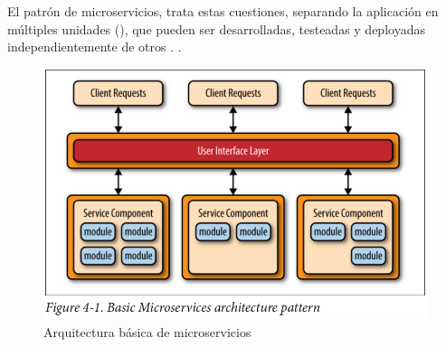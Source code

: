 El patrón de microservicios, trata estas cuestiones, separando la aplicación en múltiples unidades  (), que pueden ser desarrolladas, testeadas y deployadas independientemente de otros . .\cite[p.~27]{richards2015}

\begin{figure}
  \includegraphics[width=\linewidth]{src/images/02-capitulo-2/basic_microservices_arquitecture_pattern.png}
  \caption{Arquitectura básica de microservicios}
  \label{fig:basic_microservices_arquitecture_pattern}
\end{figure}
